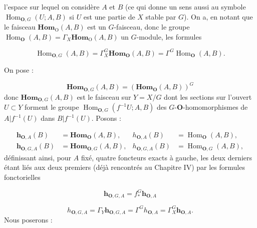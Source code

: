 \clearpage
{}

\noindent l'espace sur lequel on considère $A$ et $B$ (ce qui donne un sens
aussi au symbole $\operatorname{Hom}_{{\mathbf O},G}(U;A,B)$ si $U$ est une partie de
$X$ stable par $G$). On a, en notant que le faisceau
$\mathbf{Hom}_{\mathrm O}(A,B)$ est un $G$-faisceau, donc le groupe
$\operatorname{Hom}_{\mathbf O}(A,B)=\Gamma_X\mathbf{Hom}_{\mathrm O}(A,B)$ un $G$-module, les
formules

\[
\tag{5.6.1}
\operatorname{Hom}_{{\mathbf O},G}(A,B)
=\Gamma_X^G\mathbf{Hom}_{\mathbf O}(A,B)
=\Gamma^G\operatorname{Hom}_{\mathbf O}(A,B).
\]

On pose :

\[
\tag{5.6.2}
\mathbf{Hom}_{{\mathbf O},G}(A,B)=(\mathbf{Hom}_{\mathbf O}(A,B))^G
\]
 donc $\mathbf{Hom}_{{\mathbf O},G}(A,B)$ est le faisceau sur $Y=X/G$ dont les
sections sur l'ouvert $U\subset Y$ forment le groupe
$\operatorname{Hom}_{{\mathbf O},G}(f^{-1}U;A,B)$ des $G$-${\mathbf O}$-homomorphismes de
$A|f^{-1}(U)$ dans $B|f^{-1}(U)$. Posons :

\[
\tag{5.6.3}
\begin{aligned}
\mathbf h_{{\mathbf O},A}(B)&=\mathbf{Hom}_{\mathbf O}(A,B),&
h_{{\mathbf O},A}(B)&=\operatorname{Hom}_{\mathbf O}(A,B),\\
\mathbf h_{{\mathbf O},G,A}(B)&=\mathbf{Hom}_{{\mathbf O},G}(A,B),&
h_{{\mathbf O},G,A}(B)&=\operatorname{Hom}_{{\mathbf O},G}(A,B),
\end{aligned}
\]
 définissant ainsi, pour $A$ fixé, quatre foncteurs exacts à gauche,
les deux derniers étant liés aux deux premiers (déjà rencontrés au Chapitre
IV) par les formules fonctorielles

\[
\tag{5.6.4}
\mathbf h_{{\mathbf O},G,A}=f_*^G\mathbf h_{{\mathbf O},A}
\]

\[
\tag{5.6.5}
h_{{\mathbf O},G,A}=\Gamma_Y\mathbf h_{{\mathbf O},G,A}
=\Gamma^G h_{{\mathbf O},A}=\Gamma_X^G\mathbf h_{{\mathbf O},A}.
\]
Nous poserons :

